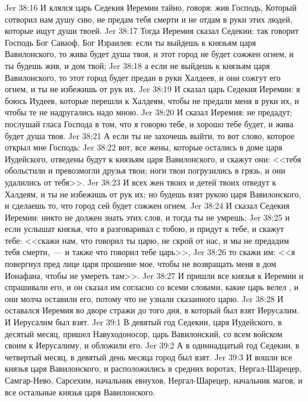 \vs Jer 38:16 И клялся царь Седекия Иеремии тайно, говоря: жив Господь, Который сотворил нам душу сию, не предам тебя смерти и не отдам в руки этих людей, которые ищут души твоей.
\vs Jer 38:17 Тогда Иеремия сказал Седекии: так говорит Господь Бог Саваоф, Бог Израилев: если ты выйдешь к князьям царя Вавилонского, то жива будет душа твоя, и этот город не будет сожжен огнем, и ты будешь жив, и дом твой;
\vs Jer 38:18 а если не выйдешь к князьям царя Вавилонского, то этот город будет предан в руки Халдеев, и они сожгут его огнем, и ты не избежишь от рук их.
\vs Jer 38:19 И сказал царь Седекия Иеремии: я боюсь Иудеев, которые перешли к Халдеям, чтобы  не предали меня в руки их, и чтобы те не надругались надо мною.
\vs Jer 38:20 И сказал Иеремия: не предадут; послушай гласа Господа в том, что я говорю тебе, и хорошо тебе будет, и жива будет душа твоя.
\vs Jer 38:21 А если ты не захочешь выйти, то вот слово, которое открыл мне Господь:
\vs Jer 38:22 вот, все жены, которые остались в доме царя Иудейского, отведены будут к князьям царя Вавилонского, и скажут они: <<тебя обольстили и превозмогли друзья твои; ноги твои погрузились в грязь, и они удалились от тебя>>.
\vs Jer 38:23 И всех жен твоих и детей твоих отведут к Халдеям, и ты не избежишь от рук их; но будешь взят рукою царя Вавилонского, и сделаешь то, что город сей будет сожжен огнем.
\vs Jer 38:24 И сказал Седекия Иеремии: никто не должен знать этих слов, и тогда ты не умрешь;
\vs Jer 38:25 и если услышат князья, что я разговаривал с тобою, и придут к тебе, и скажут тебе: <<скажи нам, что говорил ты царю, не скрой от нас, и мы не предадим тебя смерти,~--- и также что говорил тебе царь>>,
\vs Jer 38:26 то скажи им: <<я повергнул пред лице царя прошение мое, чтобы не возвращать меня в дом Ионафана, чтобы не умереть там>>.
\vs Jer 38:27 И пришли все князья к Иеремии и спрашивали его, и он сказал им согласно со всеми словами, какие царь велел , и они молча оставили его, потому что не узнали сказанного царю.
\vs Jer 38:28 И оставался Иеремия во дворе стражи до того дня, в который был взят Иерусалим. И Иерусалим был взят.
\vs Jer 39:1 В девятый год Седекии, царя Иудейского, в десятый месяц, пришел Навуходоносор, царь Вавилонский, со всем войском своим к Иерусалиму, и обложили его.
\vs Jer 39:2 А в одиннадцатый год Седекии, в четвертый месяц, в девятый день месяца город был взят.
\vs Jer 39:3 И вошли  все князья царя Вавилонского, и расположились в средних воротах, Нергал-Шарецер, Самгар-Нево, Сарсехим, начальник евнухов, Нергал-Шарецер, начальник магов, и все остальные князья царя Вавилонского.

